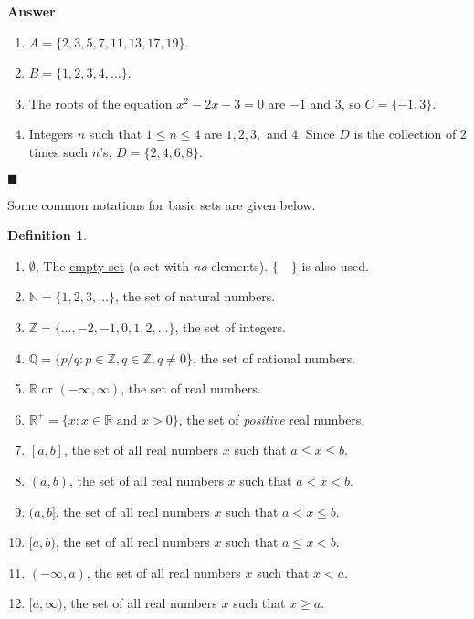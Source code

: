 \documentclass[12pt,letterpaper]{book}
\numberwithin{equation}{section}
\theoremstyle{definition}
\newtheorem{defi}[thm]{\textbf{Definition}}
\newenvironment{answer}{\noindent\textbf{Answer}}{\hfill$\blacksquare$\vspace{0.1in}}
\begin{document}
\begin{answer}\quad
\begin{enumerate}
\item $A=\{2,3,5,7,11,13,17,19\}$.
\item $B=\{1,2,3,4,\ldots\}$.
\item The roots of the equation $x^2-2x-3=0$ are $-1$ and $3$, so $C=\{-1,3\}$.
\item Integers $n$ such that $1\leq n\leq 4$ are $1,2,3,$ and $4$. Since $D$ is the collection of 2 times such $n$'s, $D=\{2,4,6,8\}$.
\end{enumerate}
\end{answer}

Some common notations for basic sets are given below.

\begin{defi}\label{common sets}\quad
\begin{enumerate}
\item $\emptyset$, The \underline{empty set} (a set with \textit{no} elements). $\{\quad\}$ is also used.
\item $\mathbb{N}=\{1,2,3,\ldots\}$, the set of natural numbers.
\item $\mathbb{Z}=\{\ldots,-2,-1,0,1,2,\ldots\}$, the set of integers. 
\item $\mathbb{Q}=\{p/q: p\in \mathbb{Z}, q\in \mathbb{Z}, q\neq 0\}$, the set of rational numbers.
\item $\mathbb{R}$ or $(-\infty,\infty)$, the set of real numbers. 
\item $\mathbb{R^+}=\{x: x\in \mathbb{R} \text{ and } x>0\}$, the set of \textit{positive} real numbers.
\item $[a,b]$, the set of all real numbers $x$ such that $a\leq x \leq b$.
\item $(a,b)$, the set of all real numbers $x$ such that $a< x < b$.
\item $(a,b]$, the set of all real numbers $x$ such that $a< x \leq  b$.
\item $[a,b)$, the set of all real numbers $x$ such that $a\leq x< b$.
\item $(-\infty,a)$, the set of all real numbers $x$ such that $x<a$.
\item $[a,\infty)$, the set of all real numbers $x$ such that $x\geq a$.
\end{enumerate}
\end{defi}
\end{document}
